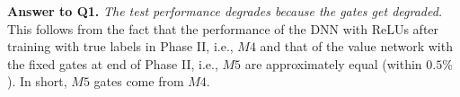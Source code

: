 \textbf{Answer to Q1.} \emph{The test performance degrades because the gates get degraded.} This follows from the fact that the performance of the DNN with ReLUs after training with true labels in Phase II, i.e., $M4$ and that of the value network with the fixed gates at end of Phase II, i.e., $M5$ are approximately equal (within $0.5\%$). In short, $M5$ gates come from $M4$.

